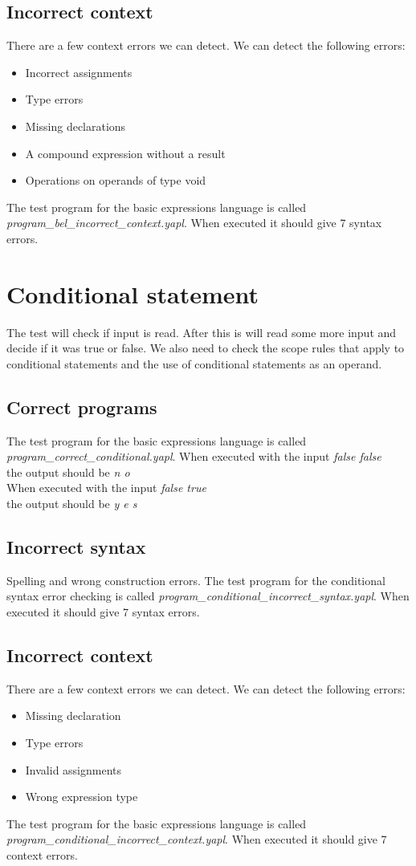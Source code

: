 \subsection{Incorrect context}
There are a few context errors we can detect. We can detect the following errors:
\begin{itemize}
\item Incorrect assignments
\item Type errors
\item Missing declarations
\item A compound expression without a result
\item Operations on operands of type void
\end{itemize}
The test program for the basic expressions language is called \emph{program_bel_incorrect_context.yapl}. When executed it should give 7 syntax errors.
\section{Conditional statement}
The test will check if input is read. After this is will read some more input and decide if it was true or false. We also need to check the scope rules that apply to conditional statements and the use of conditional statements as an operand.
\subsection{Correct programs}
The test program for the basic expressions language is called \emph{program_correct_conditional.yapl}. When executed with the input \emph{false false} \\the output should be \emph{n o}\\
When executed with the input \emph{false true} \\the output should be \emph{y e s}
\subsection{Incorrect syntax}
Spelling and wrong construction errors.
The test program for the conditional syntax error checking is called  \emph{program_conditional_incorrect_syntax.yapl}. When executed it should give 7 syntax errors.
\subsection{Incorrect context}
There are a few context errors we can detect. We can detect the following errors:
\begin{itemize}
\item Missing declaration
\item Type errors
\item Invalid assignments
\item Wrong expression type
\end{itemize}
The test program for the basic expressions language is called \emph{program_conditional_incorrect_context.yapl}. When executed it should give 7 context errors.
